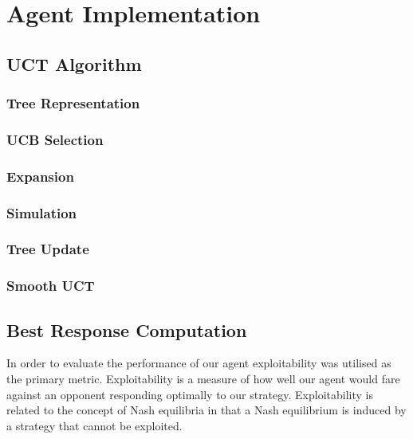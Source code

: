 \chapter{Agent Implementation}\label{ch:development}

\section{UCT Algorithm}\label{sec:MCTS}

\subsection{Tree Representation}\label{subsec:treeRepresentation}

\subsection{UCB Selection}\label{subsec:selection}

\subsection{Expansion}\label{subsec:expansion}

\subsection{Simulation}\label{subsec:simulation}

\subsection{Tree Update}\label{subsec:treeUpdate}

\subsection{Smooth UCT}\label{subsec:smoothUCT}

\section{Best Response Computation}\label{sec:bestResponseComputation}
In order to evaluate the performance of our agent exploitability was utilised as the primary metric.
Exploitability is a measure of how well our agent would fare against an opponent responding
optimally to our strategy.
Exploitability is related to the concept of Nash equilibria in that a Nash equilibrium
is induced by a strategy that cannot be exploited.


